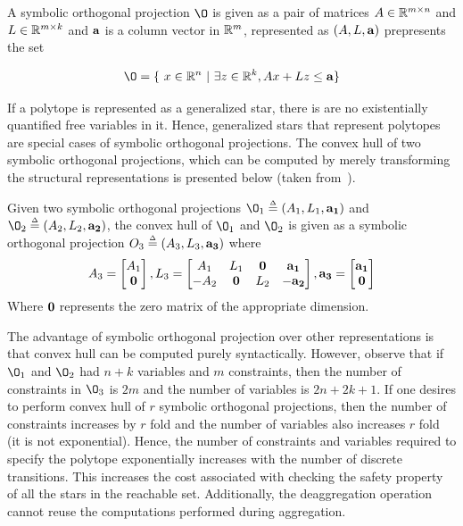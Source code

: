 \begin{definition}
A symbolic orthogonal projection $\O$ is given as a pair of matrices $A \in \reals^{m \times n}$ and $L \in \reals^{m \times k}$ and ${\bf a}$ is a column vector in $\reals^m$, represented as $(A, L, {\bf a})$ prepresents the set

$$
\O = \{~x \in \reals^n~|~ \exists z \in \reals^k, Ax + Lz \leq {\bf a}\}
$$ 
\end{definition}

If a polytope is represented as a generalized star, there is are no existentially quantified free variables in it. Hence, generalized stars that represent polytopes are special cases of symbolic orthogonal projections. The convex hull of two symbolic orthogonal projections, which can be computed by merely transforming the structural representations is presented below (taken from~\cite{hagemann2014reachability}).

\begin{definition}
Given two symbolic orthogonal projections $\O_1 \deq (A_1, L_1, {\bf a_1})$ and $\O_2 \deq (A_2, L_2, {\bf a_2})$, the convex hull of $\O_1$ and $\O_2$ is given as a symbolic orthogonal projection $O_3 \mathrel{\stackrel{\scriptscriptstyle\Delta}{=}} (A_3, L_3, {\bf a_3})$ where 
$$
A_3 = 
\begin{bmatrix} 
A_1 \\ 
{\bf 0} 
\end{bmatrix}, 
L_3 = 
\begin{bmatrix} 
A_1 & L_1 & {\bf 0} & {\bf a_1} \\
-A_2 & {\bf 0} & L_2 & -{\bf a_2}
\end{bmatrix},
{\bf a_3} =
\begin{bmatrix}
{\bf a_1} \\
{\bf 0}
\end{bmatrix}
$$
Where ${\bf 0}$ represents the zero matrix of the appropriate dimension. 
\end{definition}

The advantage of symbolic orthogonal projection over other representations is that convex hull can be computed purely syntactically. 
%
However, observe that if $\O_1$ and $\O_2$ had $n+k$ variables and $m$ constraints, then the number of constraints in $\O_3$ is $2m$ and the number of variables is $2n+2k+1$. 
%
If one desires to perform convex hull of $r$ symbolic orthogonal projections, then the number of constraints increases by $r$ fold and the number of variables also increases  $r$ fold (it is not exponential). 
%
Hence, the number of constraints and variables required to specify the polytope exponentially increases with the number of discrete transitions. This increases the cost associated with checking the safety property of all the stars in the reachable set. Additionally, the deaggregation operation cannot reuse the computations performed during aggregation.

